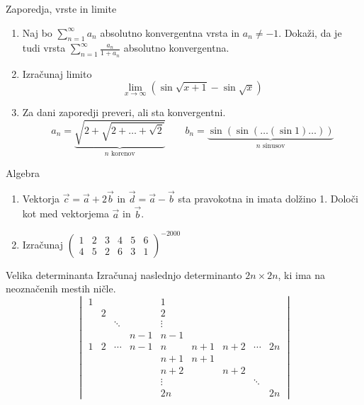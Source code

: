 \begin{frame}{Zaporedja, vrste in limite}
	\begin{enumerate}
		\item 
		Naj bo $\sum_{n=1}^\infty a_n$ absolutno konvergentna vrsta in $a_n \ne -1$.
		Dokaži, da je tudi vrsta $\sum_{n=1}^\infty \frac{a_n}{1+a_n}$
		absolutno konvergentna.

		\item
		Izračunaj limito
		$$\lim_{x \to \infty} \left( \sin \sqrt{x+1} - \sin \sqrt{x} \right)$$

		\item
		Za dani zaporedji preveri, ali sta konvergentni.
		$$ a_n = \underbrace{\sqrt{2+\sqrt{2+\dots+\sqrt{2}}}}_{n \text{ korenov}}  \qquad
		b_n = \underbrace{\sin(\sin(\dots(\sin 1)\dots))}_{n \text{ sinusov}}$$
	\end{enumerate}
\end{frame}

\begin{frame}{Algebra}
	\begin{enumerate}
		\item
		Vektorja $\vec{c} = \vec{a} + 2\vec{b} \text{ in } \vec{d} = \vec{a} - \vec{b}$
		sta pravokotna in imata dolžino 1. Določi kot med vektorjema $\vec{a}$ in $\vec{b}$.
		\item 
		Izračunaj
		$
        \begin{pmatrix}
        1 & 2 & 3 & 4 & 5 & 6 \\
        4 & 5 & 2 & 6 & 3 & 1
        \end{pmatrix}^{-2000}$
	\end{enumerate}
\end{frame}

\begin{frame}{Velika determinanta}
	Izračunaj naslednjo determinanto $2n \times 2n$, ki ima na neoznačenih mestih ničle.
	$$
    \begin{vmatrix}
    1  &    &       &       & 1      &       &       &  &  \\
       & 2  &       &       & 2      &       &       &  &  \\
       &    &\ddots &       & \vdots &       &       &  &  \\
       &    &       & n-1   & n-1    &       &       &  &  \\
    1  & 2  &\cdots & n-1   & n      & n+1   & n+2   & \cdots & 2n \\
       &    &       &      & n+1     & n+1   &       &  & \\
       &    &       &      & n+2     &       & n+2   &  &  \\
       &    &       &      & \vdots  &       &       & \ddots &  \\
	   &    &       &      &2n       &       &       &        & 2n
    \end{vmatrix}
$$
\end{frame}

